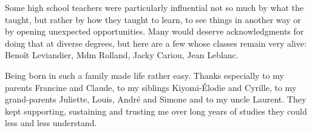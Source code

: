 Some high school teachers were particularly influential not so much by what the taught, but rather by how they taught to learn, to see things in another way or by opening unexpected opportunities. Many would deserve acknowledgments for doing that at diverse degrees, but here are a few whose classes remain very alive: Beno\^{i}t Leviandier, Mdm Rolland, Jacky Cariou, Jean Leblanc.

Being born in such a family made life rather easy. Thanks especially to my parents Francine and Claude, to my siblings Kiyomi-\'{E}lodie and Cyrille, to my grand-parents Juliette, Louis, Andr\'{e} and Simone and to my uncle Laurent. They kept supporting, sustaining and trusting me over long years of studies they could less and less understand.
